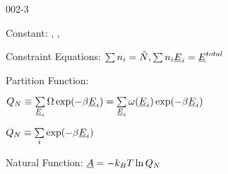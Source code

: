 \begin{mitframe}{002-3} %

    
\begin{listone}
    
    \item Constant: \nummoles, \uline{\vol}, \Temp
    
    \item Constraint Equations: $\sum\nolimits \molspecies{i} = \totmoles, \sum\nolimits \molspecies{i}\uline{\energy}_{i} = \uline{\energy}^{total}  $     
    
    \item Partition Function:
    
    \begin{listtwo}
    
    	\item $\cpf \equiv \sum\limits_{\uline{\energy}_{i}} \mpc\exp(-\boltznorm\uline{\energy}_{i}) = \sum\limits_{\uline{\energy}_{i}} \mpf(\uline{\energy}_{i})\exp(-\boltznorm\uline{\energy}_{i}) $
    
    	\item $\cpf \equiv \sum\limits_{i} \exp(-\boltznorm\uline{\energy}_{i}) $
           
    \end{listtwo}
           
    \item Natural Function: $\uline{\helmholtz} = -\boltz\Temp\ln\cpf$
    
    
    
\end{listone}
    
\end{mitframe}